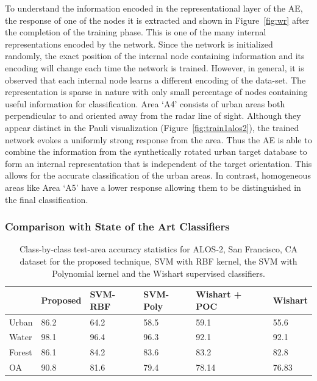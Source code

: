 To understand the information encoded in the representational layer of the AE, the response of one of the nodes it is extracted and shown in  Figure~\ref{fig:wr} after the completion of the training phase. This is one of the many internal representations encoded by the network. Since the network is initialized randomly, the exact position of the internal node containing information and its encoding will change each time the network is trained. However, in general, it is observed that each internal node learns a different encoding of the data-set. 
The representation is sparse in nature with only small percentage of nodes containing useful information for classification. 
Area `A4' consists of urban areas both perpendicular to and oriented away from the radar line of sight. Although they appear distinct in the Pauli visualization (Figure~\ref{fig:train1alos2}), the trained network evokes a uniformly strong response from the area. Thus the AE is able to combine the information from the synthetically rotated urban target database to form an internal representation that is independent of the target orientation. This allows for the accurate classification of the urban areas. In contrast, homogeneous areas like Area `A5' have a lower response allowing them to be distinguished  in the final classification.  



\subsubsection{Comparison with State of the Art Classifiers}
\label{sec:EXPT4}


\begin{table}[tbp]
\centering

\caption{Class-by-class test-area accuracy statistics for ALOS-2, San Francisco, CA dataset for the proposed technique, SVM with RBF kernel, the SVM with Polynomial kernel and the Wishart supervised classifiers. }
\label{tab:alos_comparison} 
\begin{tabularx}{\columnwidth}{X|XXXXX} 
 & Proposed & SVM-RBF  & SVM-Poly & Wishart + POC& Wishart  \\ \hline
Urban & 86.2 & 64.2 & 58.5 & 59.1 & 55.6 \\
Water & 98.1 & 96.4 & 96.3 & 92.1 & 92.1 \\
Forest & 86.1 & 84.2 & 83.6 & 83.2 & 82.8 \\ \hline
OA & 90.8  & 81.6 & 79.4 & 78.14 & 76.83  \\ 
\end{tabularx}
\end{table}

